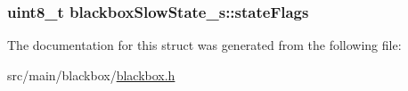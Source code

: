 \hypertarget{structblackboxSlowState__s_a7ff5c026dce2ac875d6e0eba17a94eb9}{
\subsubsection[{state\+Flags}]{\setlength{\rightskip}{0pt plus 5cm}uint8\+\_\+t blackbox\+Slow\+State\+\_\+s\+::state\+Flags}}\label{structblackboxSlowState__s_a7ff5c026dce2ac875d6e0eba17a94eb9}


The documentation for this struct was generated from the following file\+:\begin{DoxyCompactItemize}
\item 
src/main/blackbox/\hyperlink{blackbox_2blackbox_8h}{blackbox.\+h}\end{DoxyCompactItemize}
